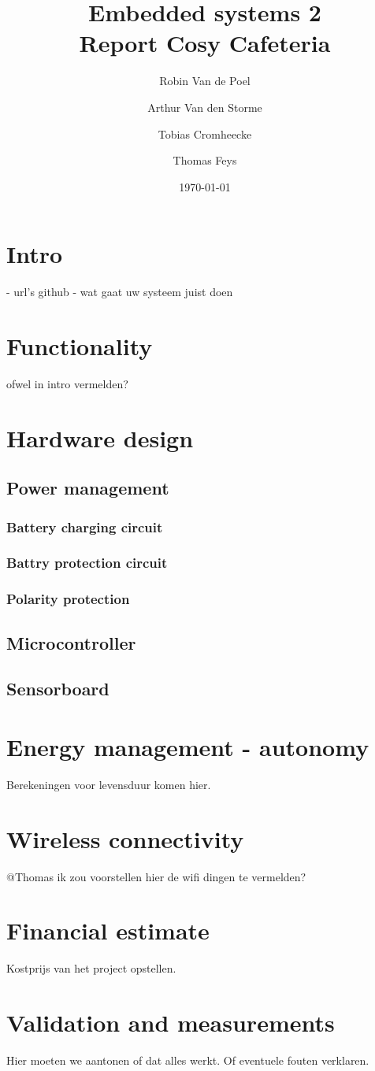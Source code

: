 \documentclass[11pt,a4paper]{article}
\begin{document}
\title{Embedded systems 2\\
	\Huge Report Cosy Cafeteria
}
\author{Robin Van de Poel\and Arthur Van den Storme\and Tobias Cromheecke\and Thomas Feys}
\date{\today}
\maketitle
\newpage

\tableofcontents
\newpage

\section{Intro}
- url's github
- wat gaat uw systeem juist doen

\section{Functionality}
ofwel in intro vermelden?

\section{Hardware design}
\subsection{Power management}
\subsubsection{Battery charging circuit}
\subsubsection{Battry protection circuit}
\subsubsection{Polarity protection}
\subsection{Microcontroller}
\subsection{Sensorboard}

\section{Energy management - autonomy}
Berekeningen voor levensduur komen hier.

\section{Wireless connectivity}
@Thomas ik zou voorstellen hier de wifi dingen te vermelden?

\section{Financial estimate}
Kostprijs van het project opstellen.

\section{Validation and measurements}
Hier moeten we aantonen of dat alles werkt. Of eventuele fouten verklaren.
\end{document}
